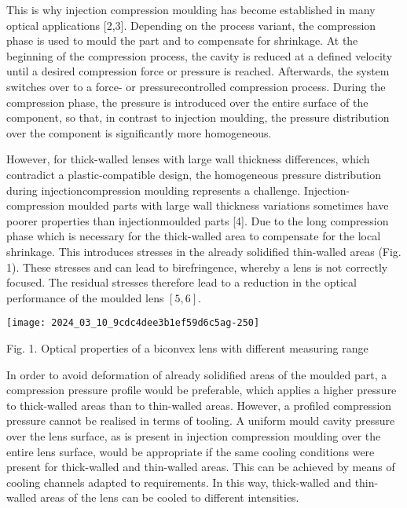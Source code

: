 \documentclass[10pt]{article}
\begin{document}
This is why injection compression moulding has become established in many optical applications [2,3]. Depending on the process variant, the compression phase is used to mould the part and to compensate for shrinkage. At the beginning of the compression process, the cavity is reduced at a defined velocity until a desired compression force or pressure is reached. Afterwards, the system switches over to a force- or pressurecontrolled compression process. During the compression phase, the pressure is introduced over the entire surface of the component, so that, in contrast to injection moulding, the pressure distribution over the component is significantly more homogeneous.

However, for thick-walled lenses with large wall thickness differences, which contradict a plastic-compatible design, the homogeneous pressure distribution during injectioncompression moulding represents a challenge. Injection-compression moulded parts with large wall thickness variations sometimes have poorer properties than injectionmoulded parts [4]. Due to the long compression phase which is necessary for the thick-walled area to compensate for the local shrinkage. This introduces stresses in the already solidified thin-walled areas (Fig. 1). These stresses and can lead to birefringence, whereby a lens is not correctly focused. The residual stresses therefore lead to a reduction in the optical performance of the moulded lens $[5,6]$.

\begin{center}
\texttt{[image: 2024\_03\_10\_9cdc4dee3b1ef59d6c5ag-250]}
\end{center}

Fig. 1. Optical properties of a biconvex lens with different measuring range

In order to avoid deformation of already solidified areas of the moulded part, a compression pressure profile would be preferable, which applies a higher pressure to thick-walled areas than to thin-walled areas. However, a profiled compression pressure cannot be realised in terms of tooling. A uniform mould cavity pressure over the lens surface, as is present in injection compression moulding over the entire lens surface, would be appropriate if the same cooling conditions were present for thick-walled and thin-walled areas. This can be achieved by means of cooling channels adapted to requirements. In this way, thick-walled and thin-walled areas of the lens can be cooled to different intensities.
\end{document}
